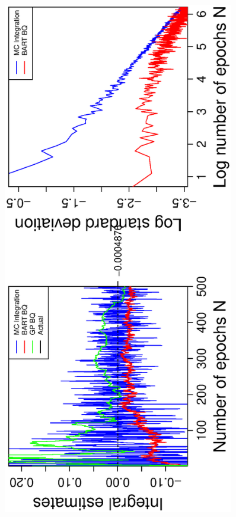 \vspace{-0.5cm}
\begin{figure}[H]
  \centering
  \hspace{-1.6cm}
  \begin{minipage}[b]{0.4\textwidth}
    \includegraphics[width = 0.9\textwidth, angle = -90]{report/Figures/5/convergenceMean53Dimensions.eps}

\end{minipage}
\end{figure}
